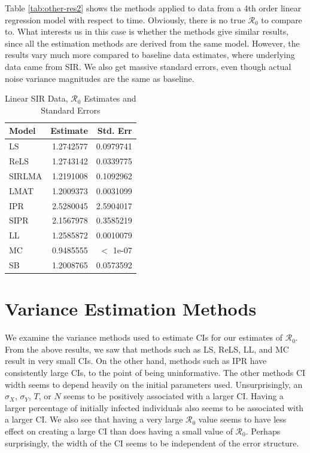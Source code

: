 \documentclass[12pt]{article}
\newcommand{\rr}{\ensuremath{\mathcal{R}_0}}
\begin{document}
Table \ref{tab:other-res2} shows the methods applied to data from a 4th order linear regression model with respect to time. Obviously, there is no true $\rr$ to compare to. What interests us in this case is whether the methods give similar results, since all the estimation methods are derived from the same model. However, the results vary much more compared to baseline data estimates, where underlying data came from SIR. We also get massive standard errors, even though actual noise variance magnitudes are the same as baseline.

\begin{table}[H]
	
	\centering
	\begin{tabular}[t]{l|r|r}
		\hline
		Model & Estimate & Std. Err\\
		\hline
		LS & 1.2742577 & 0.0979741\\
		\hline
		ReLS & 1.2743142 & 0.0339775\\
		\hline
		SIRLMA & 1.2191008 & 0.1092962\\
		\hline
		LMAT & 1.2009373 & 0.0031099\\
		\hline
		IPR & 2.5280045 & 2.5904017\\
		\hline
		SIPR & 2.1567978 & 0.3585219\\
		\hline
		LL & 1.2585872 & 0.0010079\\
		\hline
		MC & 0.9485555 & $<$ 1e-07 \\
		\hline
		SB & 1.2008765 & 0.0573592\\
		\hline
	\end{tabular}
	\caption{Linear SIR Data, $\rr$ Estimates and Standard Errors}\label{tab:other-res3}
\end{table}

\section{Variance Estimation Methods}
We examine the variance methods used to estimate CIs for our estimates of $\rr$.  From the above results, we saw that methods such as LS, ReLS, LL, and MC result in very small CIs.  On the other hand, methods such as IPR have consistently large CIs, to the point of being uninformative.  The other methods CI width seems to depend heavily on the initial parameters used.  Unsurprisingly, an $\sigma_X$, $\sigma_Y$, $T$, or $N$ seems to be positively associated with a larger CI.  Having a larger percentage of initially infected individuals also seems to be associated with a larger CI.  We also see that having a very large $\rr$ value seems to have less effect on creating a large CI than does having a small value of $\rr$.  Perhaps surprisingly, the width of the CI seems to be independent of the error structure.
\end{document}
